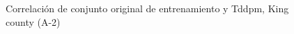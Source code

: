 \begin{figure}[H]
    \centering
    
    \caption{Correlación de conjunto original de entrenamiento y Tddpm, King county (A-2)}
    \label{pairwise-king county-a-2-tddpm_mlp}
\end{figure}